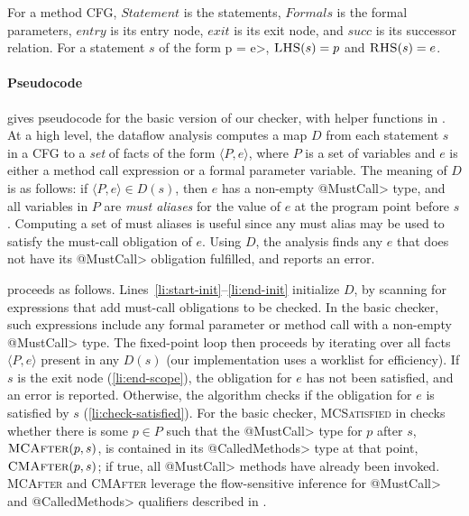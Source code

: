 For a method CFG, $\mathit{Statement}$ is the statements,
$\mathit{Formals}$ is the formal parameters,
$\mathit{entry}$ is its entry node,
$\mathit{exit}$ is its exit node, and
$\mathit{succ}$ is its successor relation.
For a statement
$s$ of the form \<p = e>, $\textsc{LHS}(s) = p$ and $\textsc{RHS}(s) = e$.   

\paragraph{Pseudocode}  gives pseudocode for the
basic version of our checker, with helper functions in .  At a
high level, the dataflow analysis computes a map $D$ from each statement $s$ in
a CFG to a \emph{set} of facts of the form $\langle P, e \rangle$, where $P$ is
a set of variables and $e$ is either a method call expression or a formal
parameter variable.  The meaning of $D$ is as follows: if $\langle P, e \rangle
\in D(s)$, then $e$ has a non-empty \<@MustCall> type, and all variables in $P$
are \emph{must aliases} for the value of $e$ at the program point before $s$.
Computing a set of must aliases is useful since any must alias may be used to
satisfy the must-call obligation of $e$.  Using $D$, the analysis finds any $e$
that does not have its \<@MustCall> obligation fulfilled, and reports an error.

 proceeds as follows.
Lines~\ref{li:start-init}--\ref{li:end-init} initialize $D$, by scanning for
expressions that add must-call obligations to be checked.  
In the basic checker, such expressions include any formal parameter or method
call with a non-empty \<@MustCall> type.  The fixed-point loop then proceeds by
iterating over all facts $\langle P, e \rangle$ present in any $D(s)$ (our
implementation uses a worklist for efficiency).  If $s$ is the exit node
(\cref{li:end-scope}), the obligation for $e$ has not been satisfied, and an
error is reported.  Otherwise, the algorithm checks if the obligation for $e$ is
satisfied by $s$ (\cref{li:check-satisfied}).  For the basic checker, \textsc{MCSatisfied} in
 checks whether there is some $p \in P$ such that
the \<@MustCall> type for $p$ after $s$, $\textsc{MCAfter}(p,s)$, is
contained in its \<@CalledMethods> type at that point, $\textsc{CMAfter}(p,s)$;
if true, all \<@MustCall> methods have already been invoked.  \textsc{MCAfter}
and \textsc{CMAfter} leverage the flow-sensitive inference for \<@MustCall> and
\<@CalledMethods> qualifiers described in .
 

